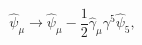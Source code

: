 \begin{equation}
\hat\psi_\mu\to\hat\psi_\mu -\frac{1}{2}\hat\gamma_\mu\gamma^5
\hat\psi_5,
\end{equation}


